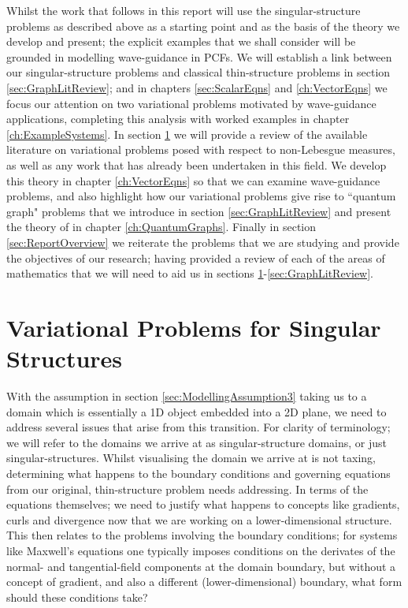 Whilst the work that follows in this report will use the singular-structure problems as described above as a starting point and as the basis of the theory we develop and present; the explicit examples that we shall consider will be grounded in modelling wave-guidance in PCFs.
We will establish a link between our singular-structure problems and classical thin-structure problems in section \ref{sec:GraphLitReview}; and in chapters \ref{sec:ScalarEqns} and \ref{ch:VectorEqns} we focus our attention on two variational problems motivated by wave-guidance applications, completing this analysis with worked examples in chapter \ref{ch:ExampleSystems}.
In section \ref{sec:VariationalProblemLitReview} we will provide a review of the available literature on variational problems posed with respect to non-Lebesgue measures, as well as any work that has already been undertaken in this field.
We develop this theory in chapter \ref{ch:VectorEqns} so that we can examine wave-guidance problems, and also highlight how our variational problems give rise to ``quantum graph" problems that we introduce in section \ref{sec:GraphLitReview} and present the theory of in chapter \ref{ch:QuantumGraphs}.
Finally in section \ref{sec:ReportOverview} we reiterate the problems that we are studying and provide the objectives of our research; having provided a review of each of the areas of mathematics that we will need to aid us in sections \ref{sec:VariationalProblemLitReview}-\ref{sec:GraphLitReview}.

\section{Variational Problems for Singular Structures} \label{sec:VariationalProblemLitReview}
With the assumption in section \ref{sec:ModellingAssumption3} taking us to a domain which is essentially a 1D object embedded into a 2D plane, we need to address several issues that arise from this transition.
For clarity of terminology; we will refer to the domains we arrive at as singular-structure domains, or just singular-structures.
Whilst visualising the domain we arrive at is not taxing, determining what happens to the boundary conditions and governing equations from our original, thin-structure problem needs addressing.
In terms of the equations themselves; we need to justify what happens to concepts like gradients, curls and divergence now that we are working on a lower-dimensional structure.
This then relates to the problems involving the boundary conditions; for systems like Maxwell's equations one typically imposes conditions on the derivates of the normal- and tangential-field components at the domain boundary, but without a concept of gradient, and also a different (lower-dimensional) boundary, what form should these conditions take? \newline

